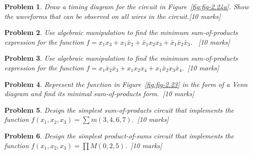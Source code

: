 \documentclass[twocolumn]{article}
\newtheorem{prob}{Problem}
\newcommand{\bx}{\bar{x}}
\begin{document}
\begin{prob}
Draw a timing diagram for the circuit in Figure~\ref{fig:fig-2.24a}. Show the waveforms that can be observed on all wires in the circuit.\cite[Prob 2.8]{brown2013fundamentals}[10 marks]
\end{prob}

\begin{prob}
Use algebraic manipulation to find the minimum sum-of-products expression for the function $f = x_1x_3 + x_1\bx_2 + \bx_1 x_2 x_3 + \bx_1 \bx_2 \bx_3$. ~\cite[Prob 2.12]{brown2013fundamentals}[10 marks]
\end{prob}

\begin{prob}
Use algebraic manipulation to find the minimum sum-of-products expression for the function $f = x_1\bx_2\bx_3 + x_1x_2x_4 + x_1\bx_2 x_3\bx_4$.~\cite[Prob 2.13]{brown2013fundamentals}[10 marks]
\end{prob}

\begin{prob}
Represent the function in Figure~\ref{fig:fig-2.23} in the form of a Venn diagram and find its minimal
sum-of-products form.~\cite[Prob 2.17]{brown2013fundamentals}[10 marks]
\end{prob}


\begin{prob}
Design the simplest sum-of-products circuit that implements the function $f (x_1 , x_2 , x_3 ) = \sum m(3, 4, 6, 7)$.~\cite[Prob 2.21]{brown2013fundamentals}[10 marks]
\end{prob}

\begin{prob}
Design the simplest product-of-sums circuit that implements the function $f (x_1 , x_2 , x_3 ) = \prod M (0, 2, 5)$.~\cite[Prob 2.22]{brown2013fundamentals}[10 marks]
\end{prob}




\end{document}
